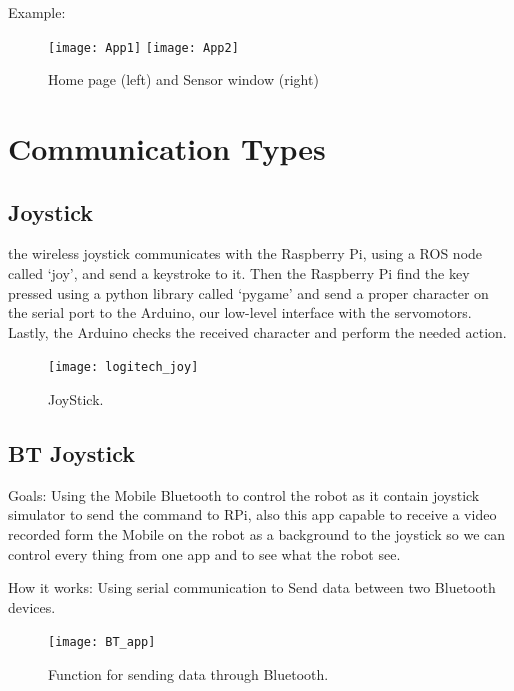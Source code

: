 	Example:
	\begin{figure}[h]		
	\centering
	\texttt{[image: App1]}\quad
    	\texttt{[image: App2]}
	\caption{Home page (left) and Sensor window (right)}
	\label{Fig:App1}
\end{figure}




\section{Communication Types}

	
	\subsection{Joystick}
	the wireless joystick communicates with the Raspberry Pi, using a ROS node called ‘joy’, and send a keystroke to it. Then the Raspberry Pi find the key pressed using a python library called ‘pygame’ and send a proper character on the serial port to the Arduino, our low-level interface with the servomotors. Lastly, the Arduino checks the received character and perform the needed action.
	\begin{figure}[h]		
		\centering
		\texttt{[image: logitech\_joy]}
		\caption{JoyStick.}
		\label{Fig:joy}
	\end{figure}

	\subsection{BT Joystick}
	Goals:
		Using the Mobile  Bluetooth to control the robot as it contain joystick simulator to send the command to RPi, also this app capable to receive a video recorded form the Mobile on the robot as a background to the joystick so we can control every thing from one app and to see what the robot see.
		
	How it works:
		Using serial communication to Send data between two Bluetooth devices.
		\begin{figure}[h]		
			\centering
			\texttt{[image: BT\_app]}
			\caption{Function for sending data through Bluetooth.}
			\label{Fig:BT}
		\end{figure}
		
